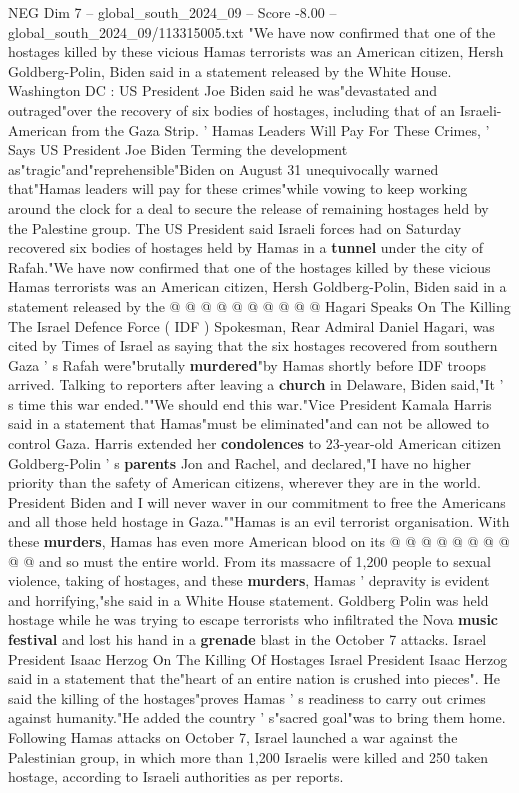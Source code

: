 \begin{textsample}{NEG Dim 7 – global\_south\_2024\_09 – Score -8.00 – global\_south\_2024\_09/113315005.txt}  \label{ex:f7_neg_176}
"We have now confirmed that one of the hostages killed by these vicious Hamas terrorists was an American citizen, Hersh Goldberg-Polin, Biden said in a statement released by the White House.
Washington DC : US President Joe Biden said he was"devastated and outraged"over the recovery of six bodies of hostages, including that of an Israeli-American from the Gaza Strip. ' Hamas Leaders Will Pay For These Crimes, ' Says US President Joe Biden Terming the development as"tragic"and"reprehensible"Biden on August 31 unequivocally warned that"Hamas leaders will pay for these crimes"while vowing to keep working around the clock for a deal to secure the release of remaining hostages held by the Palestine group.
The US President said Israeli forces had on Saturday recovered six bodies of hostages held by Hamas in a \textbf{tunnel} under the city of Rafah."We have now confirmed that one of the hostages killed by these vicious Hamas terrorists was an American citizen, Hersh Goldberg-Polin, Biden said in a statement released by the @ @ @ @ @ @ @ @ @ @ Hagari Speaks On The Killing The Israel Defence Force ( IDF ) Spokesman, Rear Admiral Daniel Hagari, was cited by Times of Israel as saying that the six hostages recovered from southern Gaza ' s Rafah were"brutally \textbf{murdered}"by Hamas shortly before IDF troops arrived.
Talking to reporters after leaving a \textbf{church} in Delaware, Biden said,"It ' s time this war ended.""We should end this war."Vice President Kamala Harris said in a statement that Hamas"must be eliminated"and can not be allowed to control Gaza.
Harris extended her \textbf{condolences} to 23-year-old American citizen Goldberg-Polin ' s \textbf{parents} Jon and Rachel, and declared,"I have no higher priority than the safety of American citizens, wherever they are in the world.
President Biden and I will never waver in our commitment to free the Americans and all those held hostage in Gaza.""Hamas is an evil terrorist organisation.
With these \textbf{murders}, Hamas has even more American blood on its @ @ @ @ @ @ @ @ @ @ and so must the entire world.
From its massacre of 1,200 people to sexual violence, taking of hostages, and these \textbf{murders}, Hamas ' depravity is evident and horrifying,"she said in a White House statement.
Goldberg Polin was held hostage while he was trying to escape terrorists who infiltrated the Nova \textbf{music} \textbf{festival} and lost his hand in a \textbf{grenade} blast in the October 7 attacks.
Israel President Isaac Herzog On The Killing Of Hostages Israel President Isaac Herzog said in a statement that the"heart of an entire nation is crushed into pieces".
He said the killing of the hostages"proves Hamas ' s readiness to carry out crimes against humanity."He added the country ' s"sacred goal"was to bring them home.
Following Hamas attacks on October 7, Israel launched a war against the Palestinian group, in which more than 1,200 Israelis were killed and 250 taken hostage, according to Israeli authorities as per reports.

\end{textsample}
